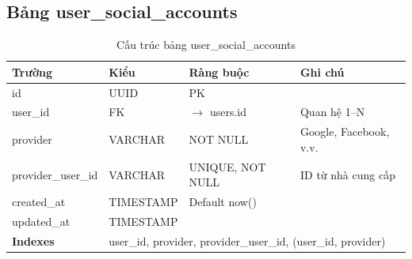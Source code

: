 \documentclass[12pt,a4paper]{article}
\begin{document}
\subsection{Bảng user\_social\_accounts}
\begin{longtable}{|l|l|l|p{5.5cm}|}
    \caption{Cấu trúc bảng user\_social\_accounts}                                                      \\
    \hline
    \rowcolor{headerblue}
    \textbf{Trường}     & \textbf{Kiểu} & \textbf{Ràng buộc}           & \textbf{Ghi chú}        \\
    \hline
    id                  & UUID          & PK                           &                         \\
    \hline
    user\_id            & FK            & $\rightarrow$ users.id       & Quan hệ 1--N            \\
    \hline
    provider            & VARCHAR       & NOT NULL                     & Google, Facebook, v.v.   \\
    \hline
    provider\_user\_id  & VARCHAR       & UNIQUE, NOT NULL             & ID từ nhà cung cấp      \\
    \hline
    created\_at         & TIMESTAMP     & Default now()                &                         \\
    \hline
    updated\_at         & TIMESTAMP     &                              &                         \\
    \hline
    \rowcolor{headerblue}
    \textbf{Indexes}    & \multicolumn{3}{l|}{user\_id, provider, provider\_user\_id, (user\_id, provider)} \\
    \hline
\end{longtable}
\end{document}
